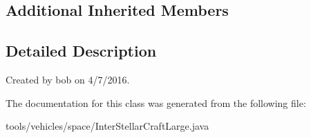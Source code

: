 \subsection*{Additional Inherited Members}


\subsection{Detailed Description}
Created by bob on 4/7/2016. 

The documentation for this class was generated from the following file\+:\begin{DoxyCompactItemize}
\item 
tools/vehicles/space/Inter\+Stellar\+Craft\+Large.\+java\end{DoxyCompactItemize}
